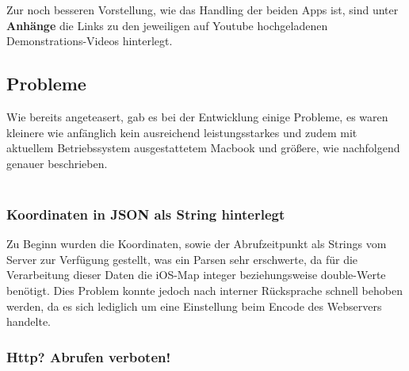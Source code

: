 Zur noch besseren Vorstellung, wie das Handling der beiden Apps ist, sind unter \textbf{Anhänge} die Links zu den jeweiligen auf Youtube hochgeladenen Demonstrations-Videos hinterlegt.



\subsection{Probleme}
Wie bereits angeteasert, gab es bei der Entwicklung einige Probleme, es waren kleinere wie anfänglich kein ausreichend leistungsstarkes und zudem mit aktuellem Betriebssystem ausgestattetem Macbook und größere, wie nachfolgend genauer beschrieben.
\\
\\
\subsubsection{Koordinaten in JSON als String hinterlegt}

Zu Beginn wurden die Koordinaten, sowie der Abrufzeitpunkt als Strings vom Server zur Verfügung gestellt, was ein Parsen sehr erschwerte, da für die Verarbeitung dieser Daten die iOS-Map integer beziehungsweise double-Werte benötigt. Dies Problem konnte jedoch nach interner Rücksprache schnell behoben werden, da es sich lediglich um eine Einstellung beim Encode des Webservers handelte.

\subsubsection{Http? Abrufen verboten!}

